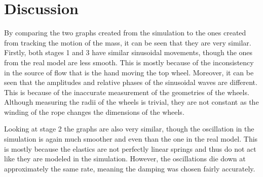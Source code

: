 \documentclass[twoside,twocolumn]{article}
\begin{document}
\section{Discussion}

By comparing the two graphs created from the simulation to the ones created from tracking the motion of the mass, it can be seen that they are very similar. Firstly, both stages 1 and 3 have similar sinusoidal movements, though the ones from the real model are less smooth. This is mostly because of the inconsistency in the source of flow that is the hand moving the top wheel. Moreover, it can be seen that the amplitudes and relative phases of the sinusoidal waves are different. This is because of the inaccurate measurement of the geometries of the wheels. Although measuring the radii of the wheels is trivial, they are not constant as the winding of the rope changes the dimensions of the wheels.

Looking at stage 2 the graphs are also very similar, though the oscillation in the simulation is again much smoother and even than the one in the real model. This is mostly because the elastics are not perfectly linear springs and thus do not act like they are modeled in the simulation. However, the oscillations die down at approximately the same rate, meaning the damping was chosen fairly accurately.
\end{document}
